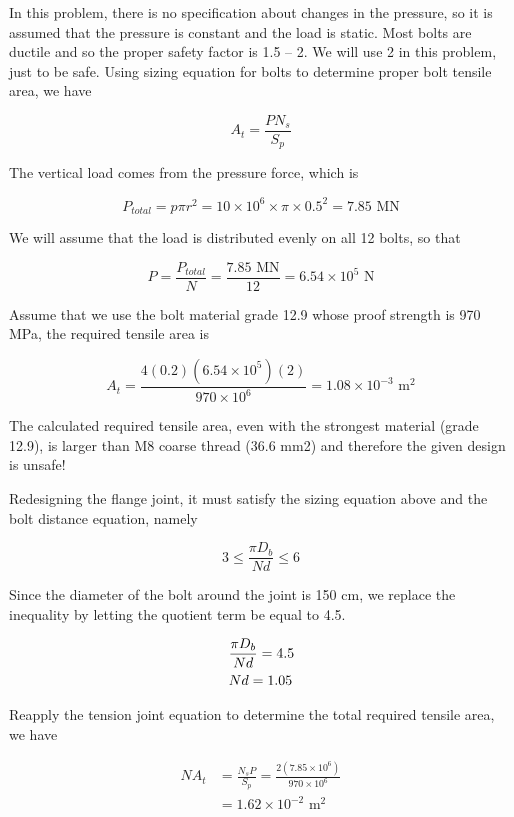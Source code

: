 \documentclass[
10pt,
a4paper,
openany,
svgnames,
]{book}
\begin{document}
\begin{solution}

In this problem, there is no specification about changes in the pressure, so it is assumed that the pressure is constant and the load is static. Most bolts are ductile and so the proper safety factor is 1.5 – 2. We will use 2 in this problem, just to be safe. Using sizing equation for bolts to determine proper bolt tensile area, we have

\[A_t = \frac{PN_s}{S_p}\]

The vertical load comes from the pressure force, which is

\[P_{total} = p\pi r^2 = 10 \times 10^6 \times \pi  \times 0.5^2 = 7.85\text{ MN}\]

We will assume that the load is distributed evenly on all 12 bolts, so that

\[P = \frac{P_{total}}{N} = \frac{7.85 \text{ MN}}{12} = 6.54 \times
  {10^5}\text{ N}\]

Assume that we use the bolt material grade 12.9 whose proof strength is 970 MPa, the required tensile area is

\[A_t = \frac{4(0.2)(6.54 \times 10^5)(2)}{970 \times 10^6} = 1.08 \times 10^{-3} \text{ m}^2\]

The calculated required tensile area, even with the strongest material (grade 12.9), is larger than M8 coarse thread (36.6 mm2) and therefore the given design is unsafe!
  
Redesigning the flange joint, it must satisfy the sizing equation above and the bolt distance equation, namely

\[3 \leqslant \frac{\pi D_b}{Nd} \leqslant 6\]

Since the diameter of the bolt around the joint is 150 cm, we replace the inequality by letting the quotient term be equal to 4.5.

\[\begin{gathered}
  \frac{\pi D_b}{Nd} = 4.5 \hfill \\
  Nd = 1.05 \hfill \\ 
\end{gathered} \]

Reapply the tension joint equation to determine the total required tensile area, we have

\begin{align*}
  NA_t &= \frac{N_sP}{S_p} = \frac{2(7.85 \times 10^6)}{970 \times 10^6} \\
         &= 1.62 \times 10^{-2} \text{ m}^2
\end{align*}


\end{solution}
\end{document}

